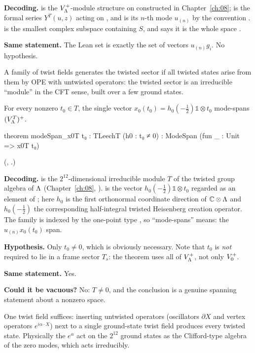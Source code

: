\begin{dictionary}
\textbf{Decoding.}  is the $V_{\Lambda}^+$-module structure on  constructed in
Chapter~\ref{ch:08};  is the formal series $Y^T(u,z)$ acting on , and
 is its $n$-th mode $u_{(n)}$ by the convention
.   is the smallest complex subspace containing
$S$, and  says it is the whole space .

\textbf{Same statement.}  The Lean set is exactly the set of vectors $u_{(n)}g_i$.  No hypothesis.
\end{dictionary}
\begin{physics}
A family of twist fields generates the twisted sector if all twisted states arise from them by OPE with untwisted operators: the twisted sector is an irreducible ``module'' in the CFT sense, built over a few ground states.
\end{physics}


\begin{theorem}\label{ch14:thm:modespan}
For every nonzero $t_0\in T$, the single vector $x_0(t_0)=h_0(-\tfrac12)\mathbb 1\otimes t_0$
mode-spans $(V_{\Lambda}^T)^+$.
\end{theorem}

\begin{leancode}
theorem modeSpan_x0T {t₀ : TLeechT} (h0 : t₀ ≠ 0) : ModeSpan (fun _ : Unit => x0T t₀)
\end{leancode}
(, .)

\begin{dictionary}
\textbf{Decoding.}   is the $2^{12}$-dimensional irreducible module $T$ of the
twisted group algebra of ${\Lambda}$ (Chapter~\ref{ch:08}, ).
 is the vector $h_0(-\tfrac12)\mathbb 1\otimes t_0$ regarded as an element of
; here $h_0$ is the first orthonormal coordinate direction of ${\mathbb{C}}\otimes{\Lambda}$ and
$h_0(-\tfrac12)$ the corresponding half-integral twisted Heisenberg creation operator.  The family
is indexed by the one-point type , so ``mode-spans'' means: the $u_{(n)}x_0(t_0)$ span.

\textbf{Hypothesis.}  Only $t_0\ne0$, which is obviously necessary.  Note that $t_0$ is \emph{not}
required to lie in a frame sector $T_s$: the theorem uses all of $V_{\Lambda}^+$, not only $V_0^{+}$.

\textbf{Same statement.}  Yes.

\textbf{Could it be vacuous?}  No: $T\ne0$, and the conclusion is a genuine spanning statement
about a nonzero space.
\end{dictionary}
\begin{physics}
One twist field suffices: inserting untwisted operators (oscillators $\partial X$ and vertex operators $e^{i\alpha\cdot X}$) next to a single ground-state twist field produces every twisted state. Physically the $e^\alpha$ act on the $2^{12}$ ground states as the Clifford-type algebra of the zero modes, which acts irreducibly.
\end{physics}


